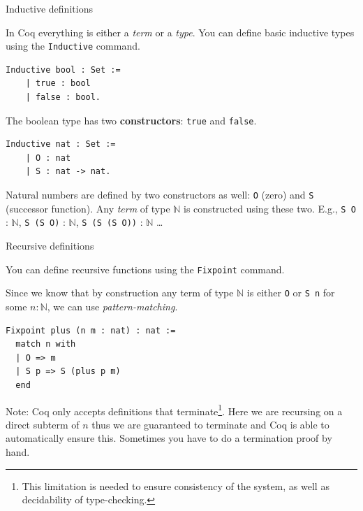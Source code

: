\documentclass[10pt]{beamer}
\begin{document}
\begin{frame}[fragile]{Inductive definitions}

  In Coq everything is either a {\it term} or a {\it type}. You can define basic inductive types using the \texttt{Inductive} command.

  \begin{lstlisting}[language=Coq]
  Inductive bool : Set :=
    | true : bool
    | false : bool.

  \end{lstlisting}

  The boolean type has two {\bf constructors}: \texttt{true} and \texttt{false}.  
  
   \begin{lstlisting}[language=Coq]
  Inductive nat : Set :=
    | O : nat
    | S : nat -> nat.  
   \end{lstlisting}

   Natural numbers are defined by two constructors as well: \texttt{O} (zero) and \texttt{S} (successor function). Any {\it term} of type $\mathbb{N}$ is constructed using these two. E.g., \texttt{S O} : $\mathbb{N}$, \texttt{S (S O)} : $\mathbb{N}$, \texttt{S (S (S O))} : $\mathbb{N}$  \ldots
\end{frame}

\begin{frame}[fragile]{Recursive definitions}

  You can define recursive functions using the \texttt{Fixpoint} command.

  Since we know that by construction any term of type $\mathbb{N}$ is either \texttt{O} or \texttt{S n} for some $n : \mathbb{N}$, we can use {\it pattern-matching}.
  
   \begin{lstlisting}[language=Coq]
  Fixpoint plus (n m : nat) : nat :=
  match n with
  | O => m
  | S p => S (plus p m)
  end
   \end{lstlisting}
   
Note: Coq only accepts definitions that terminate\footnote{This limitation is needed to ensure consistency of the system, as well as decidability of type-checking.}. Here we are recursing on a direct subterm of $n$ thus we are guaranteed to terminate and Coq is able to automatically ensure this. Sometimes you have to do a termination proof by hand. 
\end{frame}
\end{document}
